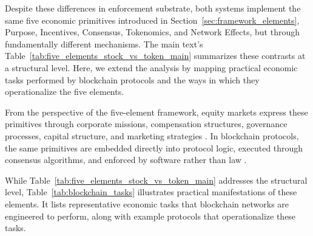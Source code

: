 \documentclass[12pt]{article}
\begin{document}
Despite these differences in enforcement substrate, both systems implement the same five economic primitives introduced in Section~\ref{sec:framework_elements}, Purpose, Incentives, Consensus, Tokenomics, and Network Effects, but through fundamentally different mechanisms. The main text's Table~\ref{tab:five_elements_stock_vs_token_main} summarizes these contrasts at a structural level. Here, we extend the analysis by mapping practical economic tasks performed by blockchain protocols and the ways in which they operationalize the five elements.

From the perspective of the five-element framework, equity markets express these primitives through corporate missions, compensation structures, governance processes, capital structure, and marketing strategies \citep{barney1991firm, murphy1999executive, shleifer1997survey, modigliani1961dividend, parker2016platform}. In blockchain protocols, the same primitives are embedded directly into protocol logic, executed through consensus algorithms, and enforced by software rather than law \citep{nakamoto2008bitcoin, buterin2022proof, rao2023bittensor}.

While Table~\ref{tab:five_elements_stock_vs_token_main} addresses the structural level, 
Table~\ref{tab:blockchain_tasks} illustrates practical manifestations of these elements. 
It lists representative economic tasks that blockchain networks are engineered to perform, 
along with example protocols that operationalize these tasks.
\end{document}
